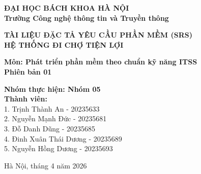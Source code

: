 \begin{titlepage}
\begin{center}
    
    \Large
    \textbf{ĐẠI HỌC BÁCH KHOA HÀ NỘI} \\
    \textbf{Trường Công nghệ thông tin và Truyền thông}
    
    \vspace{2cm}
    
    \huge
    \textbf{TÀI LIỆU ĐẶC TẢ YÊU CẦU PHẦN MỀM (SRS)} \\
    \textbf{HỆ THỐNG ĐI CHỢ TIỆN LỢI}
    
    \vspace{1.5cm}

    \large
    \textbf{Môn: Phát triển phần mềm theo chuẩn kỹ năng ITSS} \\
    \textbf{Phiên bản 01}
    
    
    \large
    \begin{center}
        \textbf{Nhóm thực hiện: Nhóm 05} \\
        \textbf{Thành viên:} \\
        1. Trịnh Thành An - 20235633 \\
        2. Nguyễn Mạnh Đức - 20235681 \\
        3. Đỗ Danh Dũng - 20235685 \\
        4. Đinh Xuân Thái Dương - 20235689 \\
        5. Nguyễn Hồng Dương - 20235693
    \end{center}
    
    \vfill
    
    \large
    Hà Nội, tháng 4 năm 2026
    
\end{center}
\end{titlepage}

